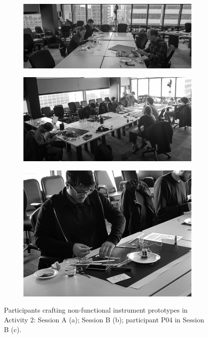 \documentclass[letterpaper, 12pt]{article}
\begin{document}
\begin{figure}[t]
    \centering
    \begin{subfigure}[]{1\textwidth}
        \centering
        \includegraphics[width=1\textwidth]{dfp_nfp_A.jpg}
        \caption{}
    \end{subfigure}
    \par\bigskip
    \begin{subfigure}[]{0.59\textwidth}
        \centering
        \includegraphics[width=1\textwidth]{dfp_nfp_B.jpg}
        \caption{}
    \end{subfigure}
    \begin{subfigure}[]{0.4\textwidth}
        \centering
        \includegraphics[width=1\textwidth]{dfp_nfp_B_P4.jpg}
        \caption{}
    \end{subfigure}
    \caption{Participants crafting non-functional instrument prototypes in Activity 2: Session A (a); Session B (b); participant P04 in Session B (c).}
    \label{fig:instrument-building}
\end{figure}
\end{document}
